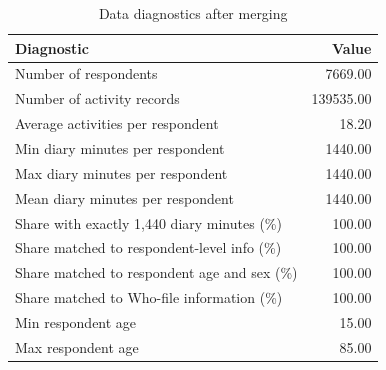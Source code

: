 \begin{table}[ht]
\centering
\begin{tabular}{lr}
  \toprule
Diagnostic & Value \\ 
  \midrule
Number of respondents & 7669.00 \\ 
  Number of activity records & 139535.00 \\ 
  Average activities per respondent & 18.20 \\ 
  Min diary minutes per respondent & 1440.00 \\ 
  Max diary minutes per respondent & 1440.00 \\ 
  Mean diary minutes per respondent & 1440.00 \\ 
  Share with exactly 1,440 diary minutes (\%) & 100.00 \\ 
  Share matched to respondent-level info (\%) & 100.00 \\ 
  Share matched to respondent age and sex (\%) & 100.00 \\ 
  Share matched to Who-file information (\%) & 100.00 \\ 
  Min respondent age & 15.00 \\ 
  Max respondent age & 85.00 \\ 
   \bottomrule
\end{tabular}
\caption{Data diagnostics after merging} 
\label{tab:diagnostics}
\end{table}
